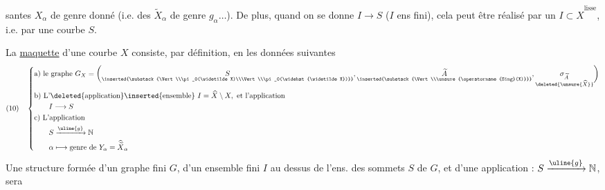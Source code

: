 santes $X_\alpha$ de genre  donné (i.e. des $\widetilde X_\alpha$ de genre $g_\alpha\ldots$). De plus, quand on se donne  $I\to S$ ($I$ ens fini), cela peut être réalisé par un $I\subset\widehat X^{\mathrm{lisse}}$, i.e. par une courbe  $S$.

La \uline{maquette} d'une courbe  $X$ consiste, par définition, en les données suivantes
\[
(10)\quad\left\{\begin{aligned}
&\text{a) le graphe }G_X=\biggl(
\underset{\inserted{\substack{\Vert\\\pi_0(\widetilde X)\\\Vert\\\pi_0(\widehat{\widetilde X})}}}{S},
\underset{\inserted{\substack{\Vert\\\unsure{\operatorname{Sing}(X)}}}}{\widetilde A},
\underset{\deleted{\unsure{\widehat X}}}{\sigma_{\widetilde A}}
\biggr)\\
&\text{b) L'}\deleted{\text{application}}\inserted{\text{ensemble}}\ I=\widehat X\setminus X,\text{ et l'application}\\
&\qquad I\longrightarrow S\\
&\text{c) L'application}\\
&\qquad S\xrightarrow{\uline{g}}\mathbb N\\
&\qquad\alpha\longmapsto\text{genre de }Y_\alpha=\widehat{\widetilde X}_\alpha
\end{aligned}\right.
\]
Une structure formée d'un graphe fini $G$, d'un ensemble fini $I$  au dessus de l'ens. des sommets $S$ de $G$, et d'une application  : $S\xrightarrow{\uline{g}}\mathbb N$, sera
